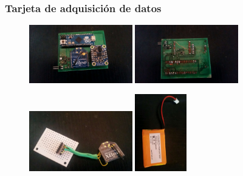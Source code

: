 \documentclass[10pt, compress]{beamer}
\begin{document}
\begin{frame}[fragile]
	\frametitle{Tarjeta de adquisición de datos}
	\begin{figure}[htbp]
		\includegraphics[width=0.4\textwidth]{./pictures/placa1}
		\includegraphics[width=0.4\textwidth]{./pictures/placa2}
	\end{figure}
	\begin{figure}[htbp]
		\includegraphics[width=0.4\textwidth]{./pictures/placa3}
		\includegraphics[width=0.2\textwidth]{./pictures/pila}
	\end{figure}
	
\end{frame}	
	
\end{document}
